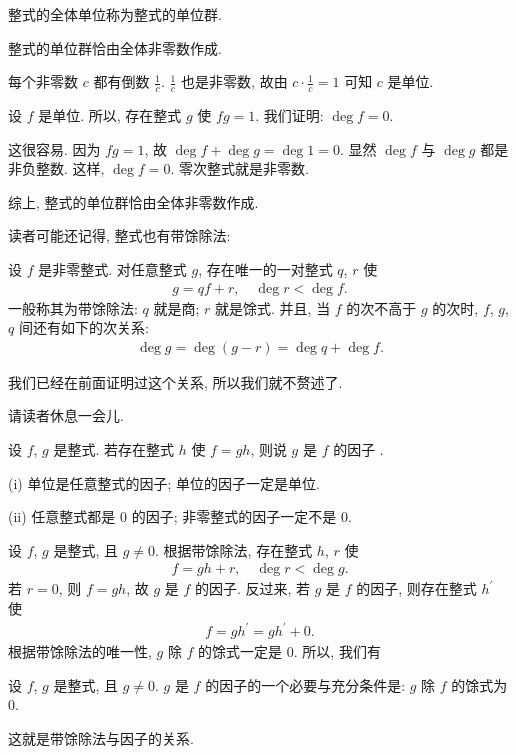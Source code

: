 \begin{definition}
    整式的全体单位称为整式的单位群.
\end{definition}

\begin{proposition}
    整式的单位群恰由全体非零数作成.
\end{proposition}

\begin{pf}
    每个非零数 $c$ 都有倒数 $\frac{1}{c}$. $\frac{1}{c}$ 也是非零数, 故由 $c \cdot \frac{1}{c} = 1$ 可知 $c$ 是单位.

    设 $f$ 是单位. 所以, 存在整式 $g$ 使 $fg = 1$. 我们证明: $\deg f = 0$.

    这很容易. 因为 $fg = 1$, 故 $\deg f + \deg g = \deg 1 = 0$. 显然 $\deg f$ 与 $\deg g$ 都是非负整数. 这样, $\deg f = 0$. 零次整式就是非零数.

    综上, 整式的单位群恰由全体非零数作成.
\end{pf}

读者可能还记得, 整式也有带馀除法:

\begin{proposition}
    设 $f$ 是非零整式. 对任意整式 $g$, 存在唯一的一对整式 $q$, $r$ 使
    \begin{align*}
        g = q f + r, \quad \deg r < \deg f.
    \end{align*}
    一般称其为带馀除法: $q$ 就是商; $r$ 就是馀式. 并且, 当 $f$ 的次不高于 $g$ 的次时, $f$, $g$, $q$ 间还有如下的次关系:
    \begin{align*}
        \deg g = \deg {(g - r)} = \deg q + \deg f.
    \end{align*}
\end{proposition}

我们已经在前面证明过这个关系, 所以我们就不赘述了.

请读者休息一会儿.

\myLine

\begin{definition}
    设 $f$, $g$ 是整式. 若存在整式 $h$ 使 $f=gh$, 则说 $g$ 是 $f$ 的因子 .
\end{definition}

\begin{example}
    (i) 单位是任意整式的因子; 单位的因子一定是单位.

    (ii) 任意整式都是 $0$ 的因子; 非零整式的因子一定不是 $0$.
\end{example}

设 $f$, $g$ 是整式, 且 $g \neq 0$. 根据带馀除法, 存在整式 $h$, $r$ 使
\begin{align*}
    f = gh + r, \quad \deg r < \deg g.
\end{align*}
若 $r = 0$, 则 $f = gh$, 故 $g$ 是 $f$ 的因子. 反过来, 若 $g$ 是 $f$ 的因子, 则存在整式 $h^{\prime}$ 使
\begin{align*}
    f = gh^{\prime} = gh^{\prime} + 0.
\end{align*}
根据带馀除法的唯一性, $g$ 除 $f$ 的馀式一定是 $0$. 所以, 我们有
\begin{proposition}
    设 $f$, $g$ 是整式, 且 $g \neq 0$. $g$ 是 $f$ 的因子的一个必要与充分条件是: $g$ 除 $f$ 的馀式为 $0$.
\end{proposition}
这就是带馀除法与因子的关系.

